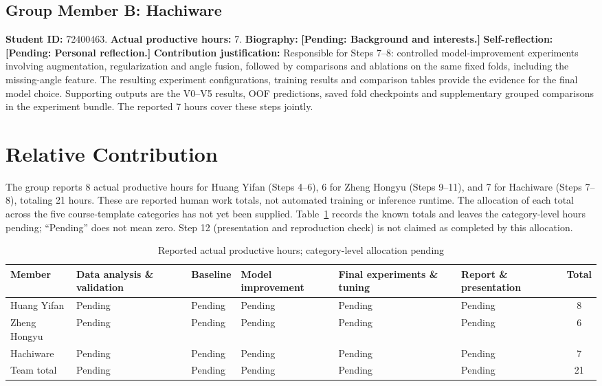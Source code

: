 \documentclass[journal]{IEEEtran}
\newcommand{\pending}[1]{\textbf{[Pending: #1]}}
\begin{document}
\subsection{Group Member B: Hachiware}
\textbf{Student ID:} 72400463. \textbf{Actual productive hours:} 7.
\textbf{Biography:} \pending{Background and interests.}
\textbf{Self-reflection:} \pending{Personal reflection.}
\textbf{Contribution justification:} Responsible for Steps 7--8: controlled model-improvement experiments involving augmentation, regularization and angle fusion, followed by comparisons and ablations on the same fixed folds, including the missing-angle feature. The resulting experiment configurations, training results and comparison tables provide the evidence for the final model choice. Supporting outputs are the V0--V5 results, OOF predictions, saved fold checkpoints and supplementary grouped comparisons in the experiment bundle. The reported 7 hours cover these steps jointly.

\section{Relative Contribution}
The group reports 8 actual productive hours for Huang Yifan (Steps 4--6), 6 for Zheng Hongyu (Steps 9--11), and 7 for Hachiware (Steps 7--8), totaling 21 hours. These are reported human work totals, not automated training or inference runtime. The allocation of each total across the five course-template categories has not yet been supplied. Table~\ref{tab:contribution} records the known totals and leaves the category-level hours pending; ``Pending'' does not mean zero. Step 12 (presentation and reproduction check) is not claimed as completed by this allocation.
\begin{table}[t]
\caption{Reported actual productive hours; category-level allocation pending}
\label{tab:contribution}\centering\renewcommand{\arraystretch}{1.3}
\begin{tabularx}{.98\textwidth}{lXXXXXc}\toprule
Member & Data analysis \& validation & Baseline & Model improvement & Final experiments \& tuning & Report \& presentation & Total\\\midrule
Huang Yifan & Pending & Pending & Pending & Pending & Pending & 8\\
Zheng Hongyu & Pending & Pending & Pending & Pending & Pending & 6\\
Hachiware & Pending & Pending & Pending & Pending & Pending & 7\\\midrule
Team total & Pending & Pending & Pending & Pending & Pending & 21\\\bottomrule
\end{tabularx}
\end{table}
\end{document}

